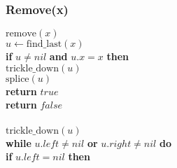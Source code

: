 \documentclass{beamer}
\newcommand{\eq}{=}
\begin{document}
\begin{frame}[shrink]
\frametitle{Remove(x)}
\begin{flushleft}
\hspace*{1em} \ensuremath{\mathrm{remove}(\ensuremath{\mathit{x}})}\\
\hspace*{1em} \hspace*{1em} \ensuremath{\ensuremath{\mathit{u}} \gets  \ensuremath{\mathrm{find\_last}(\ensuremath{\mathit{x}})}}\\
\hspace*{1em} \hspace*{1em} {\color{black} \textbf{if}} \ensuremath{\ensuremath{\mathit{u}} \ne nil} {\color{black} \textbf{and}} \ensuremath{\ensuremath{\mathit{u}}.\ensuremath{\mathit{x}} \eq x} {\color{black} \textbf{then}} \\
\hspace*{1em} \hspace*{1em} \hspace*{1em} \ensuremath{\mathrm{trickle\_down}(\ensuremath{\mathit{u}})}\\
\hspace*{1em} \hspace*{1em} \hspace*{1em} \ensuremath{\mathrm{splice}(\ensuremath{\mathit{u}})}\\
\hspace*{1em} \hspace*{1em} \hspace*{1em} {\color{black} \textbf{return}} \ensuremath{\ensuremath{\mathit{true}}}\\
\hspace*{1em} \hspace*{1em} {\color{black} \textbf{return}} \ensuremath{\ensuremath{\mathit{false}}}\\
\ \\
\hspace*{1em} \ensuremath{\mathrm{trickle\_down}(\ensuremath{\mathit{u}})}\\
\hspace*{1em} \hspace*{1em} {\color{black} \textbf{while}} \ensuremath{\ensuremath{\mathit{u}}.\ensuremath{\mathit{left}} \ne nil} {\color{black} \textbf{or}} \ensuremath{\ensuremath{\mathit{u}}.\ensuremath{\mathit{right}} \ne nil} {\color{black} \textbf{do}} \\
\hspace*{1em} \hspace*{1em} \hspace*{1em} {\color{black} \textbf{if}} \ensuremath{\ensuremath{\mathit{u}}.\ensuremath{\mathit{left}} \eq nil} {\color{black} \textbf{then}} \\

\end{flushleft}
\end{frame}
\end{document}
